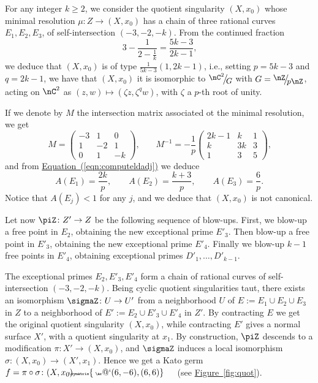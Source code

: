 \documentclass[11 pt, twoside, a4paper]{amsart}
\makeatletter
\def\nfrac#1#2{%
    \raise.5ex\hbox{\small{$#1$}}%
    \kern-.18em\big/\kern-.2em%
    \lower.5ex\hbox{\small{$#2$}}}
\newcommand{\Kld}{{A}}
\newcommand{\Kpi}{{\pi}} %
\newcommand{\Ksigma}{{\sigma}} %
\newcommand{\selfarrow}[1][]{\tiny{\!\!\!\xymatrix{\phantom{|}\ar@`{(6,-6),(6,6)}}\hspace{4mm}}}
\theoremstyle{definition}
\theoremstyle{definition}
\newcommand{\reffig}[1]{\hyperref[fig:#1]{Figure~\ref*{fig:#1}}}
\newcommand{\refeqn}[1]{\hyperref[eqn:#1]{Equation~(\ref*{eqn:#1})}}
\makeatother
\begin{document}
For any integer $k \geq 2$, we consider the quotient singularity $(X,x_0)$ whose minimal resolution $\mu \colon Z \to (X,x_0)$ has a chain of three rational curves $E_1, E_2, E_3$, of self-intersection $(-3,-2,-k)$.
From the continued fraction
$$
3-\frac{1}{2-\frac{1}{k}} = \frac{5k-3}{2k-1}\text{,}
$$
we deduce that $(X,x_0)$ is of type $\frac{1}{5k-3} (1,2k-1)$, i.e., setting $p=5k-3$ and $q=2k-1$, we have that $(X,x_0)$ it is isomorphic to $\nfrac{\nC^2}{G}$ with $G=\nfrac{\nZ}{p\nZ}$, acting on $\nC^2$ as $(z,w) \mapsto (\zeta z, \zeta^q w)$, with $\zeta$ a $p$-th root of unity.

If we denote by $M$ the intersection matrix associated ot the minimal resolution, we get
\[
M=\begin{pmatrix}
-3 & 1 & 0\\
 1 &-2 & 1\\
 0 & 1 & -k
\end{pmatrix}
\text{,}
\qquad
M^{-1}=
- \frac{1}{p}
\begin{pmatrix}
2k-1& k  & 1\\
 k 	& 3k & 3\\
 1 	& 3  & 5
\end{pmatrix}
\text{,}
\]
and from \refeqn{computeldadj} we deduce
\[
\Kld(E_1)=\frac{2k}{p},\qquad \Kld(E_2)=\frac{k+3}{p},\qquad \Kld(E_3)=\frac{6}{p}\text{.}
\]
Notice that $\Kld(E_j)<1$ for any $j$, and we deduce that $(X,x_0)$ is not canonical.

Let now $\piZ \colon Z' \to Z$ be the following sequence of blow-ups.
First, we blow-up a free point in $E_2$, obtaining the new exceptional prime $E'_3$. Then blow-up a free point in $E'_3$, obtaining the new exceptional prime $E'_4$. Finally we blow-up $k-1$ free points in $E'_4$, obtaining exceptional primes $D'_1, \ldots, D'_{k-1}$.

The exceptional primes $E_2, E'_3, E'_4$ form a chain of rational curves of self-intersection $(-3,-2,-k)$. Being cyclic quotient singularities taut, there exists an isomorphism $\sigmaZ \colon U \to U'$ from a neighborhood $U$ of $E:=E_1 \cup E_2 \cup E_3$ in $Z$ to a neighborhood of $E':=E_2 \cup E'_3 \cup E'_4$ in $Z'$.
By contracting $E$ we get the original quotient singularity $(X,x_0)$, while contracting $E'$ gives a normal surface $X'$, with a quotient singularity at $x_1$. By construction, $\piZ$ descends to a modification $\Kpi \colon X' \to (X,x_0)$, and $\sigmaZ$ induces a local isomorphism $\Ksigma \colon (X,x_0) \to (X',x_1)$.
Hence we get a Kato germ $f = \Kpi \circ \Ksigma \colon (X,x_0) \selfarrow$ (see \reffig{quot}).
\end{document}
